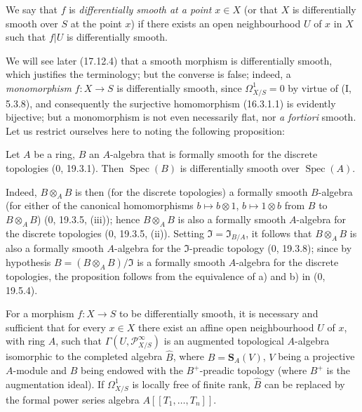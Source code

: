 We say that $f$ is \emph{differentially smooth at a point $x\in X$} (or
that $X$ is differentially smooth over $S$ at the point $x$) if there exists an
open neighbourhood $U$ of $x$ in $X$ such that $f|U$ is differentially
smooth.

We will see later (17.12.4) that a smooth morphism is differentially
smooth, which justifies the terminology; but the converse is false; indeed,
a \emph{monomorphism} $f:X\to S$ is differentially smooth,
since $\Omega_{X/S}^1=0$ by virtue of (I, 5.3.8), and consequently the
surjective homomorphism (16.3.1.1) is evidently bijective; but a
monomorphism is not even necessarily flat, nor \emph{a fortiori} smooth.
Let us restrict ourselves here to noting the following proposition:

\begin{proposition}[16.10.2]
\label{IV.16.10.2}
Let $A$ be a ring, $B$ an $A$-algebra that is formally smooth for the
discrete topologies (0, 19.3.1). Then $\operatorname{Spec}(B)$ is
differentially smooth over $\operatorname{Spec}(A)$.
\end{proposition}

Indeed, $B\otimes_A B$ is then (for the discrete topologies) a formally
smooth $B$-algebra (for either of the canonical
homomorphisms $b\mapsto b\otimes1$, $b\mapsto1\otimes b$ from $B$
to $B\otimes_A B$) (0, 19.3.5, (iii)); hence $B\otimes_A B$ is also a
formally smooth $A$-algebra for the discrete topologies (0, 19.3.5,
(ii)). Setting $\mathfrak{I}=\mathfrak{I}_{B/A}$, it follows that
$B\otimes_A B$ is also a formally smooth $A$-algebra for the
$\mathfrak{I}$-preadic topology (0, 19.3.8); since by hypothesis
$B=(B\otimes_A B)/\mathfrak{I}$ is a formally smooth $A$-algebra for
the discrete topologies, the proposition follows from the equivalence of a)
and b) in (0, 19.5.4).

\begin{proposition}[16.10.3]
\label{IV.16.10.3}
For a morphism $f:X\to S$ to be differentially smooth, it is necessary and
sufficient that for every $x\in X$ there exist an affine open neighbourhood
$U$ of $x$, with ring $A$, such that $\Gamma(U,\mathscr{P}_{X/S}^{\infty})$ is
an augmented topological $A$-algebra isomorphic to the completed algebra
$\widehat B$, where $B=\mathbf{S}_A(V)$, $V$ being a projective $A$-module and
$B$ being endowed with the $B^+$-preadic topology (where $B^+$ is the
augmentation ideal). If $\Omega_{X/S}^1$ is locally free of finite rank,
$\widehat B$ can be replaced by the formal power series algebra
$A[[T_1,\ldots,T_n]]$.
\end{proposition}

